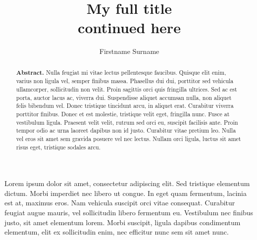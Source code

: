 \documentclass[a4paper,justified]{tufte-handout}
\title[Short Title]{\textbf{\textnormal{My full title\\[0.1cm] continued here}}}
\author{Firstname Surname}
\begin{document}
\makeatletter
\renewcommand{\@tufte@reset@par}{%
  \setlength{\RaggedRightParindent}{1.0pc}%
  \setlength{\JustifyingParindent}{1.0pc}%
  \setlength{\parindent}{0pc}%
  \setlength{\parskip}{1.6ex}%
}
\@tufte@reset@par

\renewcommand{\@tufte@margin@par}{%
  \setlength{\RaggedRightParindent}{0.5pc}%
  \setlength{\JustifyingParindent}{0.5pc}%
  \setlength{\parindent}{0pc}%
  \setlength{\parskip}{1.2ex}%
}
\makeatother



\maketitle

\bigskip


\vspace{-0.3cm}
\begin{abstract} \noindent
\textbf{Abstract.} Nulla feugiat mi vitae lectus pellentesque faucibus. Quisque elit enim, varius non ligula vel, semper finibus massa. Phasellus dui dui, porttitor sed vehicula ullamcorper, sollicitudin non velit. Proin sagittis orci quis fringilla ultrices. Sed ac est porta, auctor lacus ac, viverra dui. Suspendisse aliquet accumsan nulla, non aliquet felis bibendum vel. Donec tristique tincidunt arcu, in aliquet erat. Curabitur viverra porttitor finibus. Donec et est molestie, tristique velit eget, fringilla nunc. Fusce at vestibulum ligula. Praesent velit velit, rutrum sed orci eu, suscipit facilisis ante. Proin tempor odio ac urna laoreet dapibus non id justo. Curabitur vitae pretium leo. Nulla vel eros sit amet sem gravida posuere vel nec lectus. Nullam orci ligula, luctus sit amet risus eget, tristique sodales arcu.
\end{abstract}\vspace{-0.3cm}

\bigskip

Lorem ipsum dolor sit amet, consectetur adipiscing elit. Sed tristique elementum dictum. Morbi imperdiet nec libero ut congue. In eget quam fermentum, lacinia est at, maximus eros. Nam vehicula suscipit orci vitae consequat. Curabitur feugiat augue mauris, vel sollicitudin libero fermentum eu. Vestibulum nec finibus justo, sit amet elementum lorem. Morbi suscipit, ligula dapibus condimentum elementum, elit ex sollicitudin enim, nec efficitur nunc sem sit amet nunc.
\end{document}
